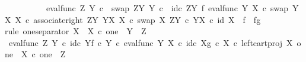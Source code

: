 \begin{isabellebody}
\ \ \ \ \ \ \ \ \ \ {\isacharparenleft}{\kern0pt}eval{\isacharunderscore}{\kern0pt}func\ Z\ Y\ {\isasymcirc}\isactrlsub c\ \ swap\ {\isacharparenleft}{\kern0pt}Z\isactrlbsup Y\isactrlesup {\isacharparenright}{\kern0pt}\ Y\ {\isasymcirc}\isactrlsub c\ \ {\isacharparenleft}{\kern0pt}id\isactrlsub c\ {\isacharparenleft}{\kern0pt}Z\isactrlbsup Y\isactrlesup {\isacharparenright}{\kern0pt}\ {\isasymtimes}\isactrlsub f\ {\isacharparenleft}{\kern0pt}eval{\isacharunderscore}{\kern0pt}func\ Y\ X\ {\isasymcirc}\isactrlsub c\ swap\ {\isacharparenleft}{\kern0pt}Y\isactrlbsup X\isactrlesup {\isacharparenright}{\kern0pt}\ X{\isacharparenright}{\kern0pt}{\isacharparenright}{\kern0pt}\ {\isasymcirc}\isactrlsub c\ associate{\isacharunderscore}{\kern0pt}right\ {\isacharparenleft}{\kern0pt}Z\isactrlbsup Y\isactrlesup {\isacharparenright}{\kern0pt}\ {\isacharparenleft}{\kern0pt}Y\isactrlbsup X\isactrlesup {\isacharparenright}{\kern0pt}\ X\ {\isasymcirc}\isactrlsub c\ swap\ X\ {\isacharparenleft}{\kern0pt}Z\isactrlbsup Y\isactrlesup \ {\isasymtimes}\isactrlsub c\ Y\isactrlbsup X\isactrlesup {\isacharparenright}{\kern0pt}{\isacharparenright}{\kern0pt}\ {\isasymcirc}\isactrlsub c\ {\isacharparenleft}{\kern0pt}id\ {\isacharparenleft}{\kern0pt}X{\isacharparenright}{\kern0pt}\ \ {\isasymtimes}\isactrlsub f\ \ {\isasymlangle}f{\isacharcomma}{\kern0pt}g{\isasymrangle}{\isacharparenright}{\kern0pt}{\isachardoublequoteclose}\isanewline
\ \ \isamarkupfalse%
{\isacharparenleft}{\kern0pt}rule\ one{\isacharunderscore}{\kern0pt}separator{\isacharbrackleft}{\kern0pt}\ X\ {\isacharequal}{\kern0pt}\ {\isachardoublequoteopen}X\ {\isasymtimes}\isactrlsub c\ one{\isachardoublequoteclose}{\isacharcomma}{\kern0pt}\ \ Y\ {\isacharequal}{\kern0pt}\ Z{\isacharbrackright}{\kern0pt}{\isacharparenright}{\kern0pt}\isanewline
\ \ \ \ \isamarkupfalse%
\ {\isachardoublequoteopen}{\isacharparenleft}{\kern0pt}{\isacharparenleft}{\kern0pt}eval{\isacharunderscore}{\kern0pt}func\ Z\ Y\ {\isasymcirc}\isactrlsub c\ {\isasymlangle}id\isactrlsub c\ Y{\isacharcomma}{\kern0pt}f\ {\isasymcirc}\isactrlsub c\ {\isasymbeta}\isactrlbsub Y\isactrlesub {\isasymrangle}{\isacharparenright}{\kern0pt}\ {\isasymcirc}\isactrlsub c\ eval{\isacharunderscore}{\kern0pt}func\ Y\ X\ {\isasymcirc}\isactrlsub c\ {\isasymlangle}id\isactrlsub c\ X{\isacharcomma}{\kern0pt}g\ {\isasymcirc}\isactrlsub c\ {\isasymbeta}\isactrlbsub X\isactrlesub {\isasymrangle}{\isacharparenright}{\kern0pt}\ {\isasymcirc}\isactrlsub c\ left{\isacharunderscore}{\kern0pt}cart{\isacharunderscore}{\kern0pt}proj\ X\ one\ {\isacharcolon}{\kern0pt}\ X\ {\isasymtimes}\isactrlsub c\ one\ {\isasymrightarrow}\ Z{\isachardoublequoteclose}\isanewline

\end{isabellebody}
